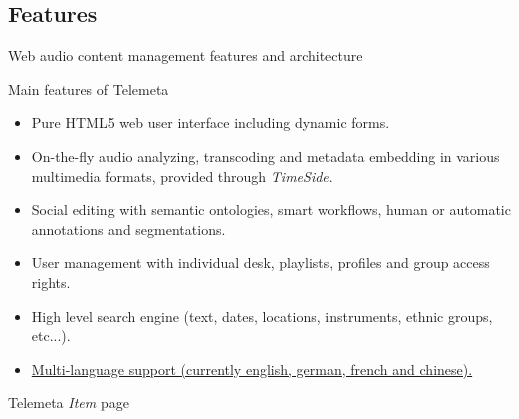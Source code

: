 \documentclass[final, hyperref, table]{beamer}
\begin{document}
\subsection{Features}
\begin{frame}[label=telemeta_features]{Web audio content management features and architecture}
  \begin{block}{Main features of Telemeta}\footnotesize
    \begin{itemize}
      \item \alert{Pure HTML5} web user interface including dynamic forms.
      \item \alert{On-the-fly audio analyzing}, transcoding and metadata
        embedding in various multimedia formats, provided through \emph{TimeSide}.
      \item \alert{Social editing} with semantic ontologies, smart workflows, human or automatic annotations and segmentations.
      \item \alert{User management} with individual desk, playlists, profiles
        and group access rights.
      \item \alert{High level search engine} (text, dates, locations, instruments, ethnic groups, etc...).
      \item \hyperlink{telemeta_languages}{Multi-language support (currently english, german, french and chinese).}
      \end{itemize}
  \end{block}
\end{frame}


\begin{frame}[plain]{Telemeta \emph{Item} page}
  \begin{center}
  \end{center}

\end{frame}
\end{document}
